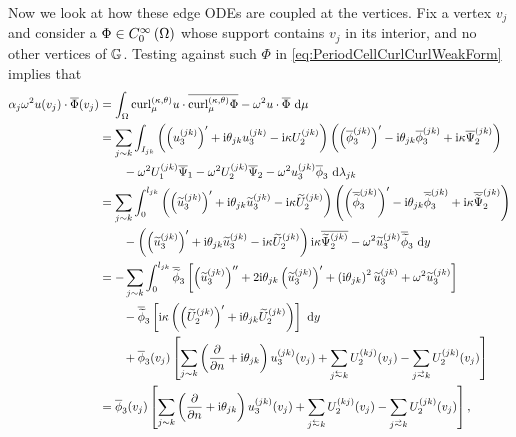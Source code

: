 Now we look at how these edge ODEs are coupled at the vertices.
Fix a vertex $v_j$ and consider a $\Phi\in C^{\infty}_{0}\left( \Omega \right)$ whose support contains $v_j$ in its interior, and no other vertices of $\mathbb{G}$.
Testing against such $\Phi$ in \eqref{eq:PeriodCellCurlCurlWeakForm} implies that
\begin{align*}
	\alpha_j\omega^2 u(v_j)\cdot\overline{\Phi}(v_j)
	&= \integral{\ddom}{ \ktcurl{\ddmes}u\cdot\overline{\ktcurl{\ddmes}\Phi} - \omega^2 u\cdot\overline{\Phi} }{\ddmes} \\
	&= \sum_{j\con k}\integral{I_{jk}}{ \bracs{ \bracs{u_3^{(jk)}}' + \rmi\qm_{jk}u_3^{(jk)} - \rmi\wavenumber U_2^{(jk)}} \bracs{ \bracs{\overline{\phi}_3^{(jk)}}' - \rmi\qm_{jk}\overline{\phi}_3^{(jk)} + \rmi\wavenumber \overline{\Psi}_2^{(jk)}} \\
	&\qquad - \omega^2 U_1^{(jk)}\overline{\Psi}_1 - \omega^2 U_2^{(jk)}\overline{\Psi}_2 - \omega^2 u_3^{(jk)}\overline{\phi}_3 }{\lambda_{jk}} \\
	&= \sum_{j\con k}\int_0^{l_{jk}} \bracs{ \bracs{\widetilde{u}_3^{(jk)}}' + \rmi\qm_{jk}\widetilde{u}_3^{(jk)} - \rmi\wavenumber \widetilde{U}_2^{(jk)}} \bracs{ \bracs{\overline{\widetilde{\phi}}_3^{(jk)}}' - \rmi\qm_{jk}\overline{\widetilde{\phi}}_3^{(jk)} + \rmi\wavenumber \overline{\widetilde{\Psi}}_2^{(jk)}} \\
	&\qquad - \bracs{\bracs{\widetilde{u}_3^{(jk)}}' + \rmi\qm_{jk}\widetilde{u}_3^{(jk)} - \rmi\wavenumber \widetilde{U}_2^{(jk)}}\rmi\wavenumber\overline{\widetilde{\Psi}_2^{(jk)}} - \omega^2 \widetilde{u}_3^{(jk)}\overline{\widetilde{\phi}}_3 \ \md y \\
	&= -\sum_{j\con k}\int_0^{l_{jk}} \overline{\widetilde{\phi}}_3
	\sqbracs{ \bracs{\widetilde{u}_3^{(jk)}}'' + 2\rmi\qm_{jk}\bracs{\widetilde{u}_3^{(jk)}}' + \bracs{\rmi\qm_{jk}}^2\widetilde{u}_3^{(jk)} + \omega^2\widetilde{u}_3^{(jk)} } \\
	&\qquad - \overline{\widetilde{\phi}}_3\sqbracs{\rmi\wavenumber\bracs{ \bracs{\widetilde{U}_2^{(jk)}}' + \rmi\qm_{jk}\widetilde{U}_2^{(jk)} } } \ \md y \\
	&\qquad + \overline{\phi}_3(v_j)\sqbracs{ \sum_{j\con k}\bracs{\pdiff{}{n}+\rmi\qm_{jk}}u_3^{(jk)}(v_j) + \sum_{j\conRight k}U_2^{(kj)}(v_j) - \sum_{j\conLeft k}U_2^{(jk)}(v_j) } \\
	&= \overline{\phi}_3(v_j)\sqbracs{ \sum_{j\con k}\bracs{\pdiff{}{n}+\rmi\qm_{jk}}u_3^{(jk)}(v_j) + \sum_{j\conRight k}U_2^{(kj)}(v_j) - \sum_{j\conLeft k}U_2^{(jk)}(v_j) },
\end{align*}

